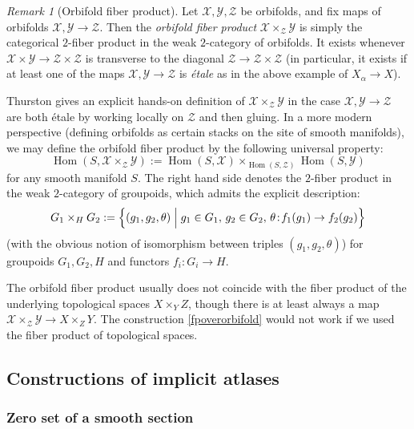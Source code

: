 \documentclass[12pt]{article}
\theoremstyle{definition}
\theoremstyle{remark}
\newtheorem{remark}[theorem]{Remark}
\numberwithin{equation}{subsection}
\newcommand{\X}{\mathcal X}
\newcommand{\Y}{\mathcal Y}
\newcommand{\Z}{\mathcal Z}
\newcommand{\Hom}{\operatorname{Hom}}
\begin{document}
\begin{remark}[Orbifold fiber product]\label{orbifoldfiberproductrmk}
Let $\X,\Y,\Z$ be orbifolds, and fix maps of orbifolds $\X,\Y\to\Z$.  Then the \emph{orbifold fiber product} $\X\times_\Z\Y$ is simply the categorical $2$-fiber product in the weak $2$-category of orbifolds.  It exists whenever $\X\times\Y\to\Z\times\Z$ is transverse to the diagonal $\Z\to\Z\times\Z$ (in particular, it exists if at least one of the maps $\X,\Y\to\Z$ is \emph{\'etale} as in the above example of $X_\alpha\to X$).

Thurston \cite[Proof of Proposition 13.2.4]{thurston} gives an explicit hands-on definition of $\X\times_\Z\Y$ in the case $\X,\Y\to\Z$ are both \'etale by working locally on $\Z$ and then gluing.  In a more modern perspective (defining orbifolds as certain stacks on the site of smooth manifolds), we may define the orbifold fiber product by the following universal property:
\begin{equation}
\Hom(S,\X\times_\Z\Y):=\Hom(S,\X)\times_{\Hom(S,\Z)}\Hom(S,\Y)
\end{equation}
for any smooth manifold $S$.  The right hand side denotes the $2$-fiber product in the weak $2$-category of groupoids, which admits the explicit description:
\begin{equation}
G_1\times_HG_2:=\Bigl\{(g_1,g_2,\theta)\Bigm|g_1\in G_1,\,g_2\in G_2,\,\theta\!:\!f_1(g_1)\to f_2(g_2)\Bigr\}
\end{equation}
(with the obvious notion of isomorphism between triples $(g_1,g_2,\theta)$) for groupoids $G_1,G_2,H$ and functors $f_i:G_i\to H$.

The orbifold fiber product usually does not coincide with the fiber product of the underlying topological spaces $X\times_YZ$, though there is at least always a map $\X\times_\Z\Y\to X\times_ZY$.  The construction \eqref{fpoverorbifold} would not work if we used the fiber product of topological spaces.
\end{remark}

\subsection{Constructions of implicit atlases}\label{constructintro}

\subsubsection{Zero set of a smooth section}\label{constructFredholmimplicitatlasintro}
\end{document}
